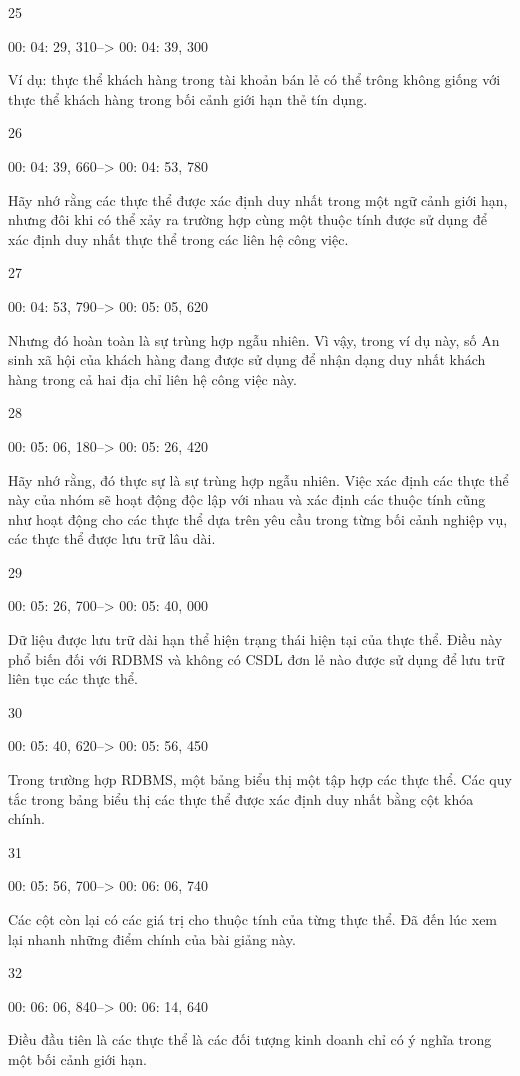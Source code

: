 25

00: 04: 29, 310--> 00: 04: 39, 300

Ví dụ: thực thể khách hàng trong tài khoản bán lẻ có thể trông không giống với thực thể khách hàng trong bối cảnh giới hạn thẻ tín dụng.

26

00: 04: 39, 660--> 00: 04: 53, 780

Hãy nhớ rằng các thực thể được xác định duy nhất trong một ngữ cảnh giới hạn, nhưng đôi khi có thể xảy ra trường hợp cùng một thuộc tính được sử dụng để xác định duy nhất thực thể trong các liên hệ công việc.

27

00: 04: 53, 790--> 00: 05: 05, 620

Nhưng đó hoàn toàn là sự trùng hợp ngẫu nhiên. Vì vậy, trong ví dụ này, số An sinh xã hội của khách hàng đang được sử dụng để nhận dạng duy nhất khách hàng trong cả hai địa chỉ liên hệ công việc này.

28

00: 05: 06, 180--> 00: 05: 26, 420

Hãy nhớ rằng, đó thực sự là sự trùng hợp ngẫu nhiên. Việc xác định các thực thể này của nhóm sẽ hoạt động độc lập với nhau và xác định các thuộc tính cũng như hoạt động cho các thực thể dựa trên yêu cầu trong từng bối cảnh nghiệp vụ, các thực thể được lưu trữ lâu dài.

29

00: 05: 26, 700--> 00: 05: 40, 000

Dữ liệu được lưu trữ dài hạn thể hiện trạng thái hiện tại của thực thể. Điều này phổ biến đối với RDBMS và không có CSDL đơn lẻ nào được sử dụng để lưu trữ liên tục các thực thể.

30

00: 05: 40, 620--> 00: 05: 56, 450

Trong trường hợp RDBMS, một bảng biểu thị một tập hợp các thực thể. Các quy tắc trong bảng biểu thị các thực thể được xác định duy nhất bằng cột khóa chính.

31

00: 05: 56, 700--> 00: 06: 06, 740

Các cột còn lại có các giá trị cho thuộc tính của từng thực thể. Đã đến lúc xem lại nhanh những điểm chính của bài giảng này.

32

00: 06: 06, 840--> 00: 06: 14, 640

Điều đầu tiên là các thực thể là các đối tượng kinh doanh chỉ có ý nghĩa trong một bối cảnh giới hạn.

